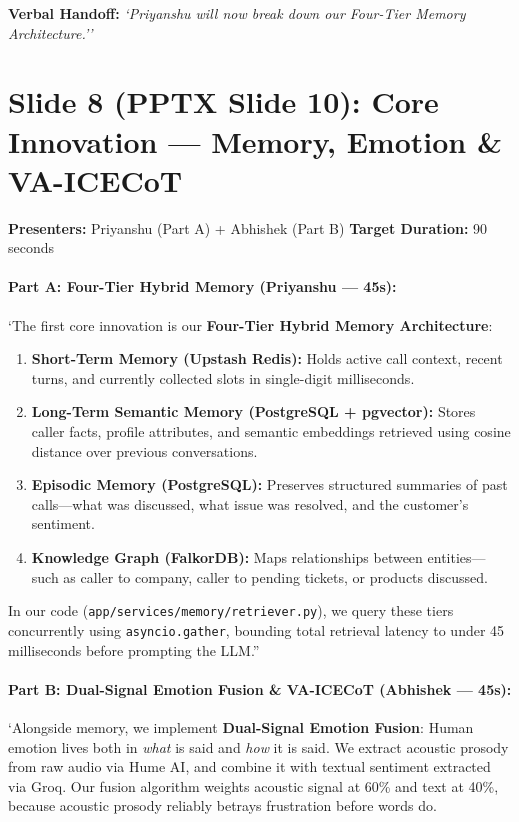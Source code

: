 \documentclass[11pt,a4paper]{article}
\begin{document}
\noindent\textbf{Verbal Handoff:} \textit{`Priyanshu will now break down our Four-Tier Memory Architecture.''}

\vspace{1.5em}

\section*{Slide 8 (PPTX Slide 10): Core Innovation — Memory, Emotion \& VA-ICECoT}
\textbf{Presenters:} Priyanshu (Part A) + Abhishek (Part B) \hfill \textbf{Target Duration:} 90 seconds

\paragraph{Part A: Four-Tier Hybrid Memory (Priyanshu — 45s):}
`The first core innovation is our \textbf{Four-Tier Hybrid Memory Architecture}:
\begin{enumerate}
    \item \textbf{Short-Term Memory (Upstash Redis):} Holds active call context, recent turns, and currently collected slots in single-digit milliseconds.
    \item \textbf{Long-Term Semantic Memory (PostgreSQL + pgvector):} Stores caller facts, profile attributes, and semantic embeddings retrieved using cosine distance over previous conversations.
    \item \textbf{Episodic Memory (PostgreSQL):} Preserves structured summaries of past calls—what was discussed, what issue was resolved, and the customer's sentiment.
    \item \textbf{Knowledge Graph (FalkorDB):} Maps relationships between entities—such as caller to company, caller to pending tickets, or products discussed.
\end{enumerate}
In our code (\texttt{app/services/memory/retriever.py}), we query these tiers concurrently using \texttt{asyncio.gather}, bounding total retrieval latency to under 45 milliseconds before prompting the LLM.''

\paragraph{Part B: Dual-Signal Emotion Fusion \& VA-ICECoT (Abhishek — 45s):}
`Alongside memory, we implement \textbf{Dual-Signal Emotion Fusion}:
Human emotion lives both in \textit{what} is said and \textit{how} it is said. We extract acoustic prosody from raw audio via Hume AI, and combine it with textual sentiment extracted via Groq. Our fusion algorithm weights acoustic signal at 60\% and text at 40\%, because acoustic prosody reliably betrays frustration before words do.
\end{document}
